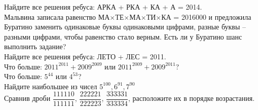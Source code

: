  Найдите все решения ребуса:  АРКА + РКА + КА + А = 2014.\\

 Мальвина записала равенство  МА$\times$ТЕ$\times$МА$\times$ТИ$\times$КА = 2016000  и предложила Буратино заменить одинаковые буквы одинаковыми цифрами, разные буквы – разными цифрами, чтобы равенство стало верным. Есть ли у Буратино шанс выполнить задание?\\

 Найдите все решения ребуса:  ЛЕТО + ЛЕС = 2011.\\

 Что больше:  $2011^{2011} + 2009^{2009}$  или  $2011^{2009} + 2009^{2011}$?\\

 Что больше: $5^{44}$ или $4^{53}$?\\

 Найдите наибольшее из чисел  $5^{100}, 6^{91}, 7^{90}$\\

 Сравнив дроби  $\dfrac{111110}{111111}$,  $\dfrac{222221}{222223}$,  $\dfrac{333331}{333334}$,  расположите их в порядке возрастания.



